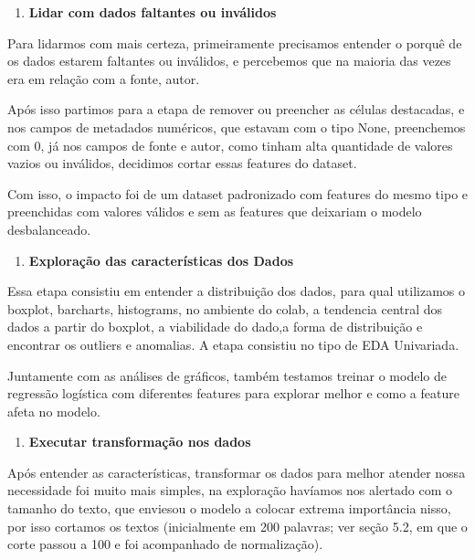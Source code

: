 \documentclass[
  brazilian,
  11pt,
]{article}
\providecommand{\tightlist}{%
  \setlength{\itemsep}{0pt}\setlength{\parskip}{0pt}}
\begin{document}
\begin{enumerate}
\def\labelenumi{\arabic{enumi}.}
\tightlist
\setcounter{enumi}{2}
\item
  \textbf{Lidar com dados faltantes ou inválidos}
\end{enumerate}

Para lidarmos com mais certeza, primeiramente precisamos entender o porquê de os dados estarem faltantes ou inválidos, e percebemos que na maioria das vezes era em relação com a fonte, autor.

Após isso partimos para a etapa de remover ou preencher as células destacadas, e nos campos de metadados numéricos, que estavam com o tipo None, preenchemos com 0, já nos campos de fonte e autor, como tinham alta quantidade de valores vazios ou inválidos, decidimos cortar essas features do dataset.

Com isso, o impacto foi de um dataset padronizado com features do mesmo tipo e preenchidas com valores válidos e sem as features que deixariam o modelo desbalanceado.

\begin{enumerate}
\def\labelenumi{\arabic{enumi}.}
\tightlist
\setcounter{enumi}{3}
\item
  \textbf{Exploração das características dos Dados}
\end{enumerate}

Essa etapa consistiu em entender a distribuição dos dados, para qual utilizamos o boxplot, barcharts, histograms, no ambiente do colab, a tendencia central dos dados a partir do boxplot, a viabilidade do dado,a forma de distribuição e encontrar os outliers e anomalias. A etapa consistiu no tipo de EDA Univariada.

Juntamente com as análises de gráficos, também testamos treinar o modelo de regressão logística com diferentes features para explorar melhor e como a feature afeta no modelo.

\begin{enumerate}
\def\labelenumi{\arabic{enumi}.}
\tightlist
\setcounter{enumi}{4}
\item
  \textbf{Executar transformação nos dados}
\end{enumerate}

Após entender as características, transformar os dados para melhor atender nossa necessidade foi muito mais simples, na exploração havíamos nos alertado com o tamanho do texto, que enviesou o modelo a colocar extrema importância nisso, por isso cortamos os textos (inicialmente em 200 palavras; ver seção 5.2, em que o corte passou a 100 e foi acompanhado de normalização).
\end{document}
